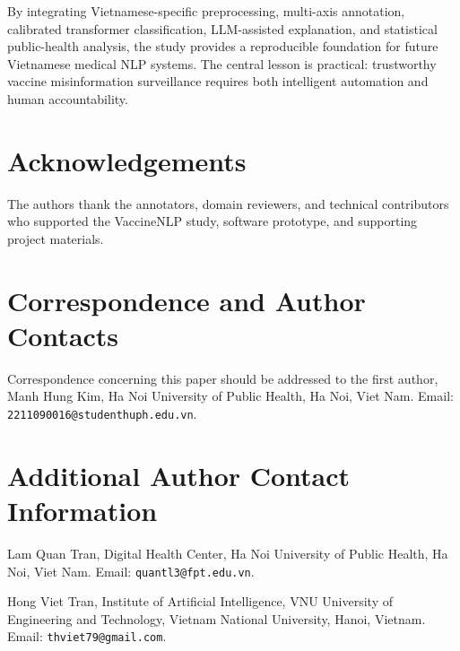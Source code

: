 \documentclass[runningheads]{llncs}
\begin{document}
By integrating Vietnamese-specific preprocessing, multi-axis annotation, calibrated transformer classification, LLM-assisted explanation, and statistical public-health analysis, the study provides a reproducible foundation for future Vietnamese medical NLP systems. The central lesson is practical: trustworthy vaccine misinformation surveillance requires both intelligent automation and human accountability.

\section*{Acknowledgements}
The authors thank the annotators, domain reviewers, and technical contributors who supported the VaccineNLP study, software prototype, and supporting project materials.




\section*{Correspondence and Author Contacts}
\noindent Correspondence concerning this paper should be addressed to the first author, Manh Hung Kim, Ha Noi University of Public Health, Ha Noi, Viet Nam. Email: \texttt{2211090016@studenthuph.edu.vn}.

\section*{Additional Author Contact Information}
\noindent Lam Quan Tran, Digital Health Center, Ha Noi University of Public Health, Ha Noi, Viet Nam. Email: \texttt{quantl3@fpt.edu.vn}.

\noindent Hong Viet Tran, Institute of Artificial Intelligence, VNU University of Engineering and Technology, Vietnam National University, Hanoi, Vietnam. Email: \texttt{thviet79@gmail.com}.
\end{document}
